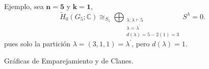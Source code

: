 \documentclass[final,xcolor=svgnames]{beamer}
\begin{document}
\begin{frame}{}
\begin{columns}
\begin{column}{0.5\textwidth}
       \begin{block}{Ejemplo, sea $\boldsymbol{n=5}$ y $\boldsymbol{k=1}$,}
         \begin{equation*}
           \widetilde H_{0}(G_{5};\mathbb{C})\cong_{S_{5}}\bigoplus_{\substack{\lambda:\lambda\vdash 5\\
               \lambda=\lambda^{'}\\d(\lambda)=5-2(1)=3}} S^{\lambda}=0.
         \end{equation*}
         pues solo la partición $\lambda=(3,1,1)=\lambda^{'}$, pero $d(\lambda)=1$.
       \end{block}
      
\begin{block}{Gráficas de Emparejamiento y de Clanes.}
      \begin{minipage}{0.15\linewidth}    
        \begin{center}
        \end{center}
      \end{minipage}
      \begin{minipage}{0.15\linewidth}    
        \begin{center}
        \end{center}
      \end{minipage}
  \end{block}


\end{column}
\end{columns}
\end{frame}
\end{document}
